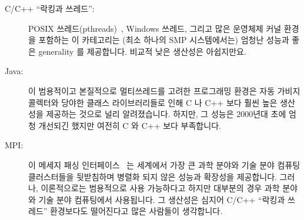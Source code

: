\begin{description}
\item[C/C++ ``락킹과 쓰레드'':] POSIX
	쓰레드(pthreads)~\cite{OpenGroup1997pthreads}, Windows 쓰레드, 그리고
	많은 운영체제 커널 환경을 포함하는 이 카테고리는 (최소 하나의 SMP
	시스템에서는) 엄청난 성능과 좋은 generality 를 제공합니다.
	비교적 낮은 생산성은 아쉽지만요.

\item[Java:] 이 범용적이고 본질적으로 멀티쓰레드를 고려한 프로그래밍 환경은
	자동 가비지 콜렉터와 당야한 클래스 라이브러리들로 인해 C 나 C++ 보다
	훨씬 높은 생산성을 제공하는 것으로 널리 알려졌습니다.
	하지만, 그 성능은 2000년대 초에 엄청 개선되긴 했지만 여전히 C 와 C++
	보다 부족합니다.

\item[MPI:] 이 메세지 패싱 인터페이스~\cite{MPIForum2008} 는 세계에서 가장 큰
	과학 분야와 기술 분야 컴퓨팅 클러스터들을 뒷받침하며 병렬화 되지 않은
	성능과 확장성을 제공합니다.
	그러나, 이론적으로는 범용적으로 사용 가능하다고 하지만 대부분의 경우
	과학 분야와 기술 분야 컴퓨팅에서 사용됩니다.
	그 생산성은 심지어 C/C++ ``락킹과 쓰레드'' 환경보다도 떨어진다고 많은
	사람들이 생각합니다.

\end{description}
